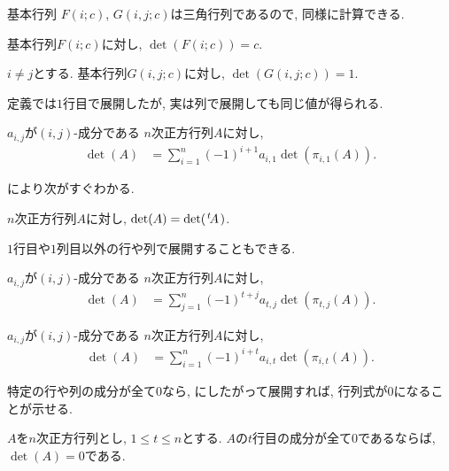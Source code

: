 基本行列
$F(i;c)$,
$G(i,j;c)$は三角行列であるので,
同様に計算できる.

\begin{example}
  基本行列$F(i;c)$に対し,
   $\det(F(i;c))=c$.
\end{example}

\begin{example}
  $i\neq j$とする.
  基本行列$G(i,j;c)$に対し,
   $\det(G(i,j;c))=1$.
\end{example}


定義では$1$行目で展開したが,
実は列で展開しても同じ値が得られる.
\begin{lemma}
  \label{lem:det:col:expansion:1}
  $a_{i,j}$が$(i,j)$-成分である
    $n$次正方行列$A$に対し,
    \begin{align*}
      \det(A)&=\sum_{i=1}^{n}
      (-1)^{i+1}a_{i,1}\det(\pi_{i,1}(A)).
    \end{align*}
\end{lemma}

により次がすぐわかる.
\begin{theorem}
  \label{thm:det:transpose}
$n$次正方行列$A$に対し, $\det(A)=\det({\left.^{t}\!A\right.})$.
\end{theorem}

$1$行目や$1$列目以外の行や列で展開することもできる.
\begin{theorem}
  \label{thm:det:row:expansion}
  $a_{i,j}$が$(i,j)$-成分である
    $n$次正方行列$A$に対し,
    \begin{align*}
      \det(A)&=
      \sum_{j=1}^{n}
      (-1)^{t+j}a_{t,j}\det(\pi_{t,j}(A)).
    \end{align*}
\end{theorem}
\begin{theorem}
  \label{thm:det:col:expansion}
  $a_{i,j}$が$(i,j)$-成分である
    $n$次正方行列$A$に対し,
    \begin{align*}
      \det(A)&=\sum_{i=1}^{n}
      (-1)^{i+t}a_{i,t}\det(\pi_{i,t}(A)).
    \end{align*}
\end{theorem}

特定の行や列の成分が全て0なら,
にしたがって展開すれば,
行列式が0になることが示せる.
\begin{prop}
  $A$を$n$次正方行列とし,
  $1\leq t \leq n$とする.
  $A$の$t$行目の成分が全て$0$であるならば,
  $\det(A)=0$である.
\end{prop}

